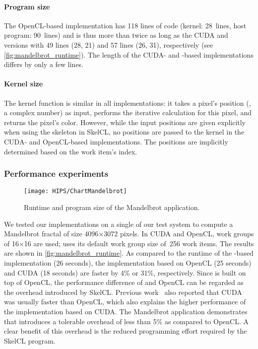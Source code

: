 \paragraph{Program size}
The OpenCL-based implementation has 118 lines of code (kernel: 28~lines, host program: 90~lines) and is thus more than twice as long as the CUDA and \SkelCL versions with 49 lines (28, 21) and 57 lines (26, 31), respectively (see \autoref{fig:mandelbrot_runtime}).
The length of the CUDA- and \SkelCL-based implementations differs by only a few lines.

\paragraph{Kernel size}
The kernel function is similar in all implementations: it takes a pixel's position (\ie, a complex number) as input, performs the iterative calculation for this pixel, and returns the pixel's color.
However, while the input positions are given explicitly when using the \map skeleton in SkelCL, no positions are passed to the kernel in the CUDA- and OpenCL-based implementations.
The positions are implicitly determined based on the work item's index.

\subsubsection*{Performance experiments}
\label{sec:mandelbrot:performance}

\begin{figure}[tb]
    \centering
    \texttt{[image: HIPS/ChartMandelbrot]}
    \caption{Runtime and program size of the Mandelbrot application.}
    \label{fig:mandelbrot_runtime}
\end{figure}%


We tested our implementations on a single \GPU of our test system to compute a Mandelbrot fractal of size 4096$\times$3072 pixels.
In CUDA and OpenCL, work groups of 16$\times$16 are used; \SkelCL uses its default work group size of~256 work items.
The results are shown in \autoref{fig:mandelbrot_runtime}.
As compared to the runtime of the \SkelCL-based implementation (26 seconds), the implementation based on OpenCL (25 seconds) and CUDA (18 seconds) are faster by 4\% or 31\%, respectively.
Since \SkelCL is built on top of OpenCL, the performance difference of \SkelCL and OpenCL can be regarded as the overhead introduced by SkelCL.
Previous work~\cite{KongDiYaLiCaStMaZh2010} also reported that CUDA was usually faster than OpenCL, which also explains the higher performance of the implementation based on CUDA.
The Mandelbrot application demonstrates that \SkelCL introduces a tolerable overhead of less than 5\% as compared to OpenCL.
A clear benefit of this overhead is the reduced programming effort required by the SkelCL program.

